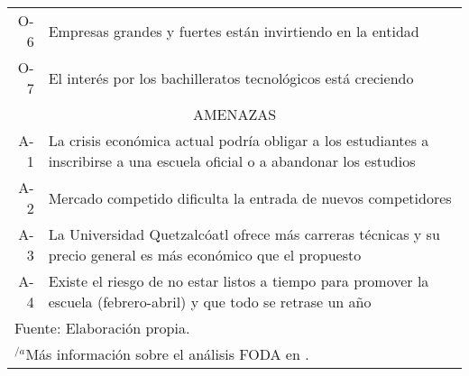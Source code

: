 \begin{table}[h!]
\begin{tabular}{r|p{5in}}
    	O-6 & Empresas grandes y fuertes están invirtiendo en la entidad \\
    	O-7 & El interés por los bachilleratos tecnológicos está creciendo \\
    	\hline
    	\multicolumn{2}{c}{AMENAZAS} \\
    	\hline
    	\hline
    	A-1 & La crisis económica actual podría obligar a los estudiantes a inscribirse a una escuela oficial o a abandonar los estudios \\
    	A-2 & Mercado competido dificulta la entrada de nuevos competidores \\
    	A-3 & La Universidad Quetzalcóatl ofrece más carreras técnicas y su precio general es más económico que el propuesto \\
    	A-4 & Existe el riesgo de no estar listos a tiempo para promover la escuela (febrero-abril) y que todo se retrase un año \\
    	\hline
    	\multicolumn{2}{l}{\footnotesize Fuente: Elaboración propia.} \\
        \multicolumn{2}{l}{$^{/a}$\footnotesize Más información sobre el análisis FODA en \citep{DAVID2003}.}
    \end{tabular}
\end{table}

